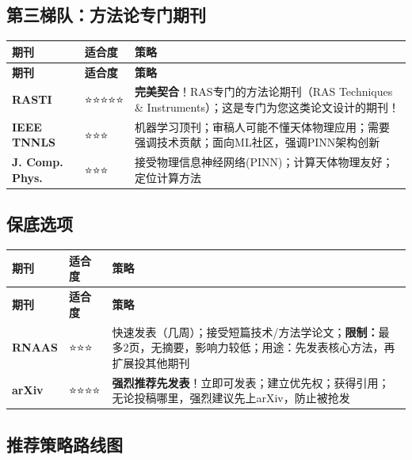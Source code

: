 \documentclass[12pt,a4paper]{article}
\begin{document}
\subsection{第三梯队：方法论专门期刊}

\begin{center}
\renewcommand{\arraystretch}{1.4}
\begin{longtable}{|p{3cm}|p{2cm}|p{8cm}|}
\hline
\rowcolor{yellow!20}
\textbf{期刊} & \textbf{适合度} & \textbf{策略} \\
\hline
\endfirsthead
\hline
\rowcolor{yellow!20}
\textbf{期刊} & \textbf{适合度} & \textbf{策略} \\
\hline
\endhead
\textbf{RASTI} & ⭐⭐⭐⭐⭐ & \textbf{完美契合}！RAS专门的方法论期刊（RAS Techniques \& Instruments）；这是专门为您这类论文设计的期刊！ \\
\hline
\textbf{IEEE TNNLS} & ⭐⭐⭐ & 机器学习顶刊；审稿人可能不懂天体物理应用；需要强调技术贡献；面向ML社区，强调PINN架构创新 \\
\hline
\textbf{J. Comp. Phys.} & ⭐⭐⭐ & 接受物理信息神经网络(PINN)；计算天体物理友好；定位计算方法 \\
\hline
\end{longtable}
\end{center}

\subsection{保底选项}

\begin{center}
\renewcommand{\arraystretch}{1.4}
\begin{longtable}{|p{3cm}|p{2cm}|p{8cm}|}
\hline
\rowcolor{gray!20}
\textbf{期刊} & \textbf{适合度} & \textbf{策略} \\
\hline
\endfirsthead
\hline
\rowcolor{gray!20}
\textbf{期刊} & \textbf{适合度} & \textbf{策略} \\
\hline
\endhead
\textbf{RNAAS} & ⭐⭐⭐ & 快速发表（几周）；接受短篇技术/方法学论文；\textbf{限制：}最多2页，无摘要，影响力较低；用途：先发表核心方法，再扩展投其他期刊 \\
\hline
\textbf{arXiv} & ⭐⭐⭐⭐ & \textbf{强烈推荐先发表}！立即可发表；建立优先权；获得引用；无论投稿哪里，强烈建议先上arXiv，防止被抢发 \\
\hline
\end{longtable}
\end{center}

\subsection{推荐策略路线图}
\end{document}
